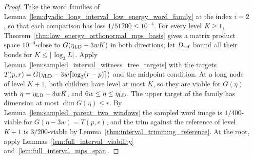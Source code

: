 \begin{proof}\leanok
    Take the word families of
    Lemma~\ref{lem:dyadic_long_interval_low_energy_word_family} at the index
    $i=2$, so that each comparison has loss $1/51200\le10^{-4}$. For every
    level $K\ge1$, Theorem~\ref{thm:low_energy_orthonormal_mps_basis} gives
    a matrix product space $10^{-4}$-close to $G(\eta_{\rm LD}-3wK)$ in both
    directions; let $D_{\rm ref}$ bound all their bonds for
    $K\le\lceil\log_2L\rceil$. Apply
    Lemma~\ref{lem:sampled_interval_witness_tree_targets} with the targets
    $T(p,r)=G(\eta_{\rm LD}-3w\lceil\log_2(r-p)\rceil)$ and the midpoint
    condition. At a long node of level $K+1$, both children have level at
    most $K$, so they are viable for $G(\eta)$ with $\eta=\eta_{\rm LD}-3wK$,
    and $6w\le\eta\le\eta_{\rm LD}$. The upper target of the family has
    dimension at most $\dim G(\eta)\le r$. By
    Lemma~\ref{lem:sampled_parent_two_windows} the sampled word image is
    $1/400$-viable for $G(\eta-3w)=T(p,r)$, and the trim against the
    reference of level $K+1$ is $3/200$-viable by
    Lemma~\ref{thm:interval_trimming_reference}. At the root, apply
    Lemmas~\ref{lem:full_interval_viability} and~\ref{lem:full_interval_mps_span}.
\end{proof}

